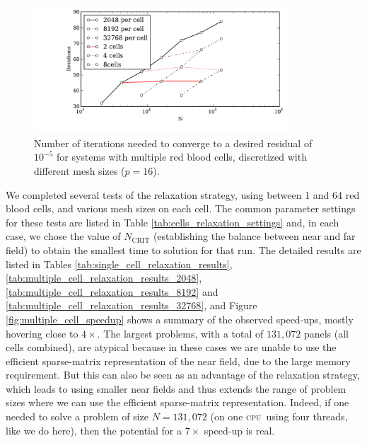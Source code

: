 \documentclass[final,leqno,]{siamltex1213}
\newcommand{\cpu}{\textsc{cpu}}
\newcommand{\ncrit}{N_{\text{CRIT}}}
\begin{document}
\begin{figure}
\begin{center}
	\includegraphics[natwidth=7in,natheight=3.5in,width=0.85\textwidth]{EthrocyteMultipleCellIterations.pdf}
	\caption{Number of iterations needed to converge to a desired residual of $10^{-5}$ for systems with multiple red blood cells, discretized with different mesh sizes ($p = 16$).}
	\label{fig:multiple_cell_iterations}
\end{center}
\end{figure}

We completed several tests of the relaxation strategy, using between 1 and 64 red blood cells, and various mesh sizes on each cell. The common parameter settings for these tests are listed in Table \ref{tab:cells_relaxation_settings} and, in each case, we chose the value of $\ncrit$ (establishing the balance between near and far field) to obtain the smallest time to solution for that run. The detailed results are listed in Tables \ref{tab:single_cell_relaxation_results}, \ref{tab:multiple_cell_relaxation_results_2048}, \ref{tab:multiple_cell_relaxation_results_8192} and \ref{tab:multiple_cell_relaxation_results_32768}, and Figure \ref{fig:multiple_cell_speedup} shows a summary of the observed speed-ups, mostly hovering close to $4\times$. The largest problems, with a total of $131,072$ panels (all cells combined), are atypical because in these cases we are unable to use the efficient sparse-matrix representation of the near field, due to the large memory requirement. But this can also be seen as an advantage of the relaxation strategy, which leads to using smaller near fields and thus extends the range of problem sizes where we can use the efficient sparse-matrix representation. Indeed, if one needed to solve a problem of size $N=131,072$ (on one \cpu\ using four threads, like we do here), then the potential for a $7\times$ speed-up is real.
\end{document}
